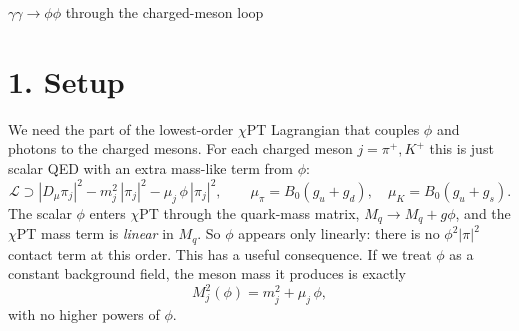 \documentclass[11pt]{article}
\begin{document}
\begin{center}
{\Large $\gamma\gamma\to\phi\phi$ through the charged-meson loop}
\end{center}

\section*{1. Setup}
We need the part of the lowest-order $\chi$PT Lagrangian that couples $\phi$
and photons to the charged mesons. For each charged meson $j=\pi^+,K^+$ this is
just scalar QED with an extra mass-like term from $\phi$:
\begin{equation}
  \mathcal L \supset |D_\mu\pi_j|^2 - m_j^2\,|\pi_j|^2 - \mu_j\,\phi\,|\pi_j|^2,
  \qquad \mu_\pi = B_0(g_u+g_d),\quad \mu_K = B_0(g_u+g_s).
\end{equation}
The scalar $\phi$ enters $\chi$PT through the quark-mass matrix,
$M_q\to M_q+g\phi$, and the $\chi$PT mass term is \emph{linear} in $M_q$. So
$\phi$ appears only linearly: there is no $\phi^2|\pi|^2$ contact term at this
order. This has a useful consequence. If we treat $\phi$ as a constant
background field, the meson mass it produces is exactly
\begin{equation}
  M_j^2(\phi) = m_j^2 + \mu_j\,\phi ,
\end{equation}
with no higher powers of $\phi$.
\end{document}
